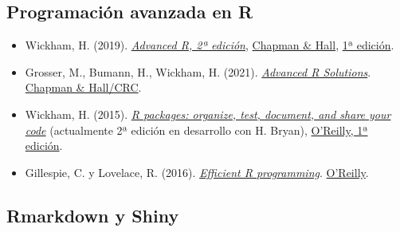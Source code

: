 \documentclass[
]{book}
\theoremstyle{break}
\theoremstyle{nonumberplain}
\begin{document}
\hypertarget{programaciuxf3n-avanzada-en-r}{%
\subsection*{Programación avanzada en R}\label{programaciuxf3n-avanzada-en-r}}

\begin{itemize}
\item
  Wickham, H. (2019). \emph{\href{https://adv-r.hadley.nz/}{Advanced R, 2ª edición}}, \href{https://www.amazon.com/dp/0815384572}{Chapman \& Hall}, \href{http://adv-r.had.co.nz/}{1ª edición}.
\item
  Grosser, M., Bumann, H., Wickham, H. (2021). \emph{\href{https://advanced-r-solutions.rbind.io/}{Advanced R Solutions}}. \href{https://www.routledge.com/p/book/9781032007496}{Chapman \& Hall/CRC}.
\item
  Wickham, H. (2015). \emph{\href{http://r-pkgs.had.co.nz/}{R packages: organize, test, document, and share your code}} (actualmente 2ª edición en desarrollo con H. Bryan), \href{http://shop.oreilly.com/product/0636920034421.do}{O'Reilly, 1ª edición}.
\item
  Gillespie, C. y Lovelace, R. (2016). \emph{\href{https://bookdown.org/csgillespie/efficientR/}{Efficient R programming}}. \href{https://www.oreilly.com/library/view/efficient-r-programming/9781491950777/}{O'Reilly}.
\end{itemize}

\hypertarget{rmarkdown-y-shiny}{%
\subsection*{Rmarkdown y Shiny}\label{rmarkdown-y-shiny}}
\end{document}
